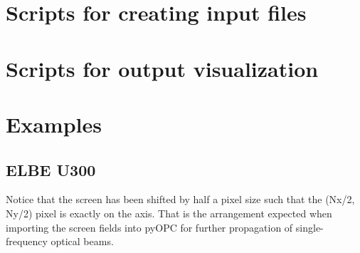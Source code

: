 \documentclass[11pt]{article}
\begin{document}
\section{Scripts for creating input files}

\section{Scripts for output visualization}

\section{Examples}

\subsection{ELBE U300}

Notice that the screen has been shifted by half a pixel size
such that the (Nx/2, Ny/2) pixel is exactly on the axis.
That is the arrangement expected when importing the screen fields into pyOPC
for further propagation of single-frequency optical beams.
\end{document}
